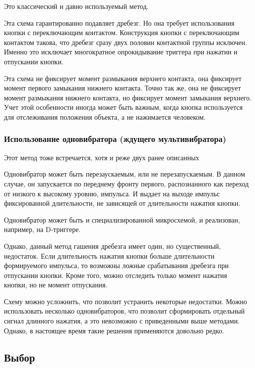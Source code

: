 \documentclass{altsu-report}
\begin{document}
Это классический и давно используемый метод.

Эта схема гарантированно подавляет дребезг. Но она требует использования кнопки с переключающим контактом. Конструкция кнопки с переключающим контактом такова, что дребезг сразу двух половин контактной группы исключен. Именно это исключает многократное опрокидывание триггера при нажатии и отпускании кнопки.

Эта схема не фиксирует момент размыкания верхнего контакта, она фиксирует момент первого замыкания нижнего контакта. Точно так же, она не фиксирует момент размыкания нижнего контакта, но фиксирует момент замыкания верхнего. Учет этой особенности иногда может быть важным, когда кнопка используется для отслеживания положения объекта, а не нажимается человеком.

\subsubsection*{Использование одновибратора (ждущего мультивибратора)}

Этот метод тоже встречается, хотя и реже двух ранее описанных

Одновибратор может быть перезаускаемым, или не перезапускаемым. В данном случае, он запускается по переднему фронту первого, распознанного как переход от низкого к высокому уровню, импульса. И выдает на выходе импульс фиксированной длительности, не зависящей от длительности нажатия кнопки.

Одновибратор может быть и специализированной микросхемой, и реализован, например, на D-триггере.

Однако, данный метод гашения дребезга имеет один, но существенный, недостаток. Если длительность нажатия кнопки больше длительности формируемого импульса, то возможны ложные срабатывания дребезга при отпускании кнопки. Кроме того, можно отследить только момент нажатия кнопки, но не момент отпускания.

Схему можно усложнить, что позволит устранить некоторые недостатки. Можно использовать несколько одновибраторов, что позволит сформировать отдельный сигнал длинного нажатия, а это невозможно с приведенными выше методами. Однако, в настоящее время такие решения применяются довольно редко.

\subsection*{Выбор}
\end{document}
